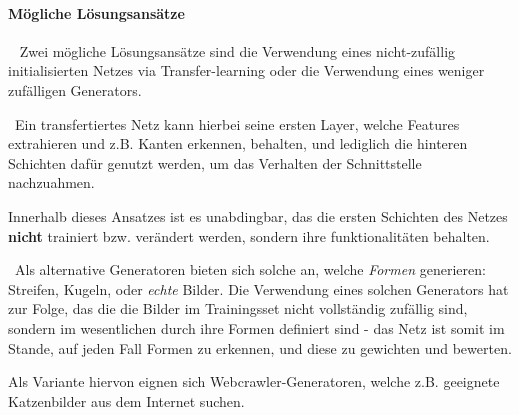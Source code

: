 \paragraph{Mögliche Lösungsansätze}~\newline
Zwei mögliche Lösungsansätze sind die Verwendung eines nicht-zufällig initialisierten Netzes via Transfer-learning \cite{todo} oder die Verwendung eines weniger zufälligen Generators.

~\newline Ein transfertiertes Netz kann hierbei seine ersten Layer, welche Features extrahieren und z.B. Kanten erkennen, behalten, und lediglich die hinteren Schichten dafür genutzt werden, um das Verhalten der Schnittstelle nachzuahmen. 

Innerhalb dieses Ansatzes ist es unabdingbar, das die ersten Schichten des Netzes \textbf{nicht} trainiert bzw. verändert werden, sondern ihre funktionalitäten behalten. 

~\newline Als alternative Generatoren bieten sich solche an, welche \textit{Formen} generieren: Streifen, Kugeln, oder \textit{echte} Bilder. Die Verwendung eines solchen Generators hat zur Folge, das die die Bilder im Trainingsset nicht vollständig zufällig sind, sondern im wesentlichen durch ihre Formen definiert sind - das Netz ist somit im Stande, auf jeden Fall Formen zu erkennen, und diese zu gewichten und bewerten.

Als Variante hiervon eignen sich Webcrawler-Generatoren, welche z.B. geeignete Katzenbilder aus dem Internet suchen.   